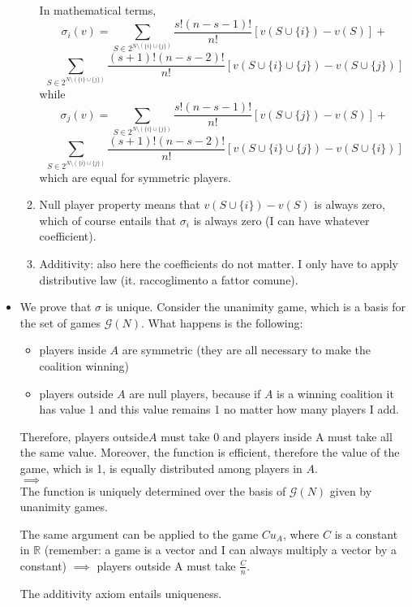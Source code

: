 \begin{itemize}
\begin{enumerate}
		\noindent In mathematical terms,
		\[
			\sigma_i(v) = \sum_{S \in 2^{N \setminus (\{i\} \cup \{j\})}}
			{\frac{s!(n-s-1)!}{n!}\left[v(S \cup \{i\}) - v(S)\right]} +\]
			\[ 
			\sum_{S \in 2^{N \setminus (\{i\} \cup \{j\})}}
			{\frac{(s+1)!(n-s-2)!}{n!}\left[v(S \cup \{i\} \cup \{j\}) - v(S \cup \{j\})\right]}
		\]
		while
		\[
		\sigma_j(v) = \sum_{S \in 2^{N \setminus (\{i\} \cup \{j\})}}
		{\frac{s!(n-s-1)!}{n!}\left[v(S \cup \{j\}) - v(S)\right]} +\]
		\[ 
		\sum_{S \in 2^{N \setminus (\{i\} \cup \{j\})}}
		{\frac{(s+1)!(n-s-2)!}{n!}\left[v(S \cup \{i\} \cup \{j\}) - v(S \cup \{i\})\right]}
		\]
		which are equal for symmetric players.
		
		\item Null player property means that $v(S \cup \{i\}) - v(S)$ is always 
		zero, which of course entails that $\sigma_i$ is always zero (I can have 
		whatever coefficient).
	
		\item Additivity: also here the coefficients do not matter. I only have to 
		apply distributive law (it. raccoglimento a fattor comune).
	\end{enumerate}

	\item We prove that $\sigma$ is unique.
	\noindent Consider the 
	unanimity game, which is a basis for the set of games $\mathcal{G}(N)$. 
	What happens is the following:
	\begin{itemize}
		\item players inside $A$ are symmetric (they are all necessary to make 
		the coalition winning)
	
		\item players outside $A$ are null players, because if $A$ is a winning 
		coalition it has value 1 and this value remains 1 no matter how many 
		players I add.
	\end{itemize}
	Therefore, players outside$A$ must take 0 and players inside A must take all the same value. Moreover, the function is efficient, therefore the value of the game, which is 1, is equally distributed among players in $A$.\\
	$\implies$\\
	The function is uniquely determined over the basis of $\mathcal{G}(N)$ given by unanimity games.
	
	\noindent The same argument can be applied to the game $Cu_A$, where $C$ is a constant in $\mathbb{R}$
	(remember: a game is a vector and I can always multiply a vector by a 
	constant) $\implies$ players outside A must take 
	$\frac{C}{n}$.
	
	\noindent The additivity axiom entails uniqueness.
\end{itemize}


